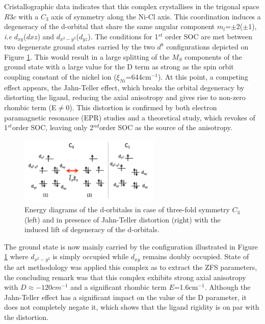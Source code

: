 \documentclass[12pt]{report}
\numberwithin{equation}{section}
\begin{document}
Cristallographic data indicates that this complex crystallises in the trigonal space $R3c$ with a $C_3$ axis of symmetry along the Ni-Cl axis.
This coordination induces a degeneracy of the d-orbital that share the same angular component $m_l$=$\pm2$($\pm1$), \textit{i.e} $d_{xy}$($d{xz}$) and $d_{x^2-y^2}$($d_{yz}$). 
The conditions for 1$^{st}$ order SOC are met between two degenerate ground states carried by the two $d^8$ configurations depicted on Figure \ref{NiMe6tren_config}.
This would result in a large splitting of the $M_S$ components of the ground state with a large value for the D term as strong as the spin orbit coupling constant of the nickel ion ($\xi_{Ni}$=644cm$^{-1}$).
At this point, a competing effect appears, the Jahn-Teller effect, which breaks the orbital degeneracy by distorting the ligand, reducing the axial anisotropy and gives rise to non-zero rhombic term (E$\neq$0).
This distortion is confirmed by both electron paramagnetic resonance (EPR) studies and a theoretical study, which revokes of 1$^{st}$order SOC, leaving only 2$^{nd}$order SOC as the source of the anisotropy.

\begin{figure}
    \centering
    \includegraphics[width=0.6\textwidth]{Images/NiMe6tren_config.png}
    \caption{Energy diagrams of the d-orbitalss in case of three-fold symmetry $C_3$ (left) and in presence of Jahn-Teller distortion (right) with the induced lift of degeneracy of the d-orbitals. }
    \label{NiMe6tren_config}
\end{figure}

The ground state is now mainly carried by the configuration illustrated in Figure \ref{NiMe6tren_config} where $d_{x^2-y^2}$ is simply occupied while $d_{xy}$ remains doubly occupied.
State of the art methodology was applied this complex as to extract the ZFS parameters, the concluding remark was that this complex exhibits strong axial anisotropy with $D\approx-120cm^{-1}$ and a significant rhombic term $E$=1.6cm$^{-1}$. 
Although the Jahn-Teller effect has a significant impact on the value of the D parameter, it does not completely negate it, which shows that the ligand rigidity is on par with the distortion.
\end{document}
